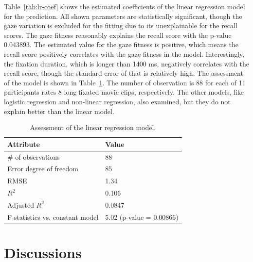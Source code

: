 \documentclass[oneside,master]{snueethesis}
\begin{document}
Table~\ref{tab:lr-coef} shows the estimated coefficients of the linear regression model for the prediction. All shown parameters are statistically significant, though the gaze variation is excluded for the fitting due to its unexplainable for the recall scores. The gaze fitness reasonably explains the recall score with the p-value 0.043893. The estimated value for the gaze fitness is positive, which means the recall score positively correlates with the gaze fitness in the model. Interestingly, the fixation duration, which is longer than 1400 ms, negatively correlates with the recall score, though the standard error of that is relatively high. The assessment of the model is shown in Table~\ref{tab:lr-goodness}. The number of observation is 88 for each of 11 participants rates 8 long fixated movie clips, respectively. The other models, like logistic regression and non-linear regression, also examined, but they do not explain better than the linear model.

\begin{table}[ht]
\begin{center} 
\caption{Assessment of the linear regression model.} 
\vskip 0.12in
\label{tab:lr-goodness} 
\begin{tabular}{ll} 
\hline
Attribute   & Value \\ 
\hline
\# of observations & 88 \\
Error degree of freedom & 85 \\
RMSE & 1.34 \\
$R^{2}$ & 0.106 \\
Adjusted $R^{2}$ & 0.0847 \\
F-statistics vs. constant model & 5.02 (p-value = 0.00866) \\
\hline
\end{tabular} 
\end{center} 
\end{table}

\chapter{Discussions}
\end{document}
